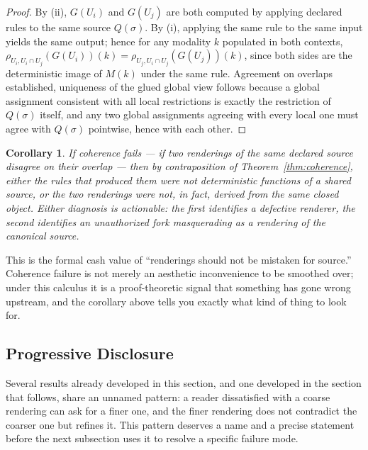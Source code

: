 \documentclass[11pt]{article}
\newtheorem{corollary}[theorem]{Corollary}
\theoremstyle{definition}
\begin{document}
\begin{proof}
By (ii), $G(U_i)$ and $G(U_j)$ are both computed by applying declared rules to the same source $Q(\sigma)$. By (i), applying the same rule to the same input yields the same output; hence for any modality $k$ populated in both contexts, $\rho_{U_i, U_i\cap U_j}(G(U_i))(k) = \rho_{U_j, U_i \cap U_j}(G(U_j))(k)$, since both sides are the deterministic image of $M(k)$ under the same rule. Agreement on overlaps established, uniqueness of the glued global view follows because a global assignment consistent with all local restrictions is exactly the restriction of $Q(\sigma)$ itself, and any two global assignments agreeing with every local one must agree with $Q(\sigma)$ pointwise, hence with each other.
\end{proof}

\begin{corollary}
\label{cor:coherence-failure}
If coherence fails --- if two renderings of the same declared source disagree on their overlap --- then by contraposition of Theorem~\ref{thm:coherence}, either the rules that produced them were not deterministic functions of a shared source, or the two renderings were not, in fact, derived from the same closed object. Either diagnosis is actionable: the first identifies a defective renderer, the second identifies an unauthorized fork masquerading as a rendering of the canonical source.
\end{corollary}

This is the formal cash value of ``renderings should not be mistaken for source.'' Coherence failure is not merely an aesthetic inconvenience to be smoothed over; under this calculus it is a proof-theoretic signal that something has gone wrong upstream, and the corollary above tells you exactly what kind of thing to look for.

\subsection{Progressive Disclosure}
\label{sec:progressive-disclosure}

Several results already developed in this section, and one developed in the section that follows, share an unnamed pattern: a reader dissatisfied with a coarse rendering can ask for a finer one, and the finer rendering does not contradict the coarser one but refines it. This pattern deserves a name and a precise statement before the next subsection uses it to resolve a specific failure mode.
\end{document}
